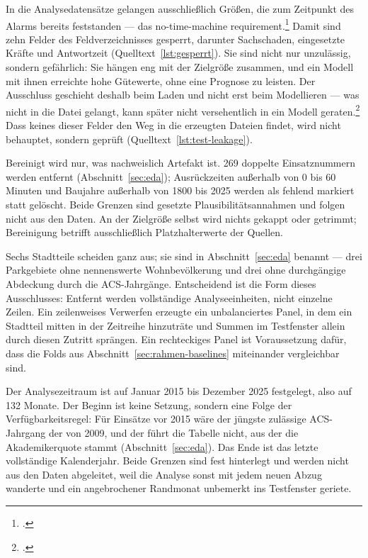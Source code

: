 In die Analysedatensätze gelangen ausschließlich Größen, die zum Zeitpunkt des
Alarms bereits feststanden --- das no-time-machine
requirement.\footcite[559]{Kaufman2011} Damit sind zehn Felder des
Feldverzeichnisses gesperrt, darunter Sachschaden, eingesetzte Kräfte und
Antwortzeit (Quelltext~\ref{lst:gesperrt}). Sie sind nicht nur unzulässig,
sondern gefährlich: Sie hängen eng mit der Zielgröße zusammen, und ein Modell
mit ihnen erreichte hohe Gütewerte, ohne eine Prognose zu leisten. Der
Ausschluss geschieht deshalb beim Laden und nicht erst beim Modellieren ---
was nicht in die Datei gelangt, kann später nicht versehentlich in ein Modell
geraten.\footcite[560]{Kaufman2011} Dass keines dieser Felder den Weg in die
erzeugten Dateien findet, wird nicht behauptet, sondern geprüft
(Quelltext~\ref{lst:test-leakage}).

Bereinigt wird nur, was nachweislich Artefakt ist. 269 doppelte Einsatznummern
werden entfernt (Abschnitt~\ref{sec:eda}); Ausrückzeiten außerhalb von 0 bis 60
Minuten und Baujahre außerhalb von 1800 bis 2025 werden als fehlend markiert
statt gelöscht. Beide Grenzen sind gesetzte Plausibilitätsannahmen und folgen
nicht aus den Daten. An der Zielgröße selbst wird nichts gekappt oder getrimmt;
Bereinigung betrifft ausschließlich Platzhalterwerte der Quellen.

Sechs Stadtteile scheiden ganz aus; sie sind in Abschnitt~\ref{sec:eda}
benannt --- drei Parkgebiete ohne nennenswerte Wohnbevölkerung und drei ohne
durchgängige Abdeckung durch die ACS-Jahrgänge. Entscheidend ist die Form
dieses Ausschlusses: Entfernt werden vollständige Analyseeinheiten, nicht
einzelne Zeilen. Ein zeilenweises Verwerfen erzeugte ein unbalanciertes Panel,
in dem ein Stadtteil mitten in der Zeitreihe hinzuträte und Summen im
Testfenster allein durch diesen Zutritt sprängen. Ein rechteckiges Panel ist
Voraussetzung dafür, dass die Folds aus Abschnitt~\ref{sec:rahmen-baselines}
miteinander vergleichbar sind.

Der Analysezeitraum ist auf Januar 2015 bis Dezember 2025 festgelegt, also auf
132 Monate. Der Beginn ist keine Setzung, sondern eine Folge der
Verfügbarkeitsregel: Für Einsätze vor 2015 wäre der jüngste zulässige
ACS-Jahrgang der von 2009, und der führt die Tabelle nicht, aus der die
Akademikerquote stammt (Abschnitt~\ref{sec:eda}). Das Ende ist das letzte
vollständige Kalenderjahr. Beide Grenzen sind fest hinterlegt und werden nicht
aus den Daten abgeleitet, weil die Analyse sonst mit jedem neuen Abzug wanderte
und ein angebrochener Randmonat unbemerkt ins Testfenster geriete.


